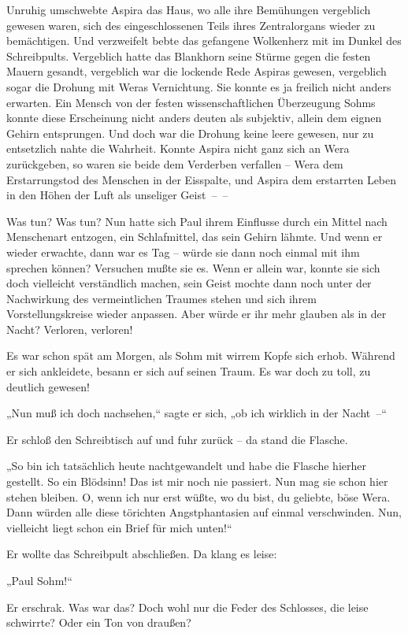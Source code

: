Unruhig umschwebte Aspira das Haus, wo alle ihre Bemühungen
vergeblich gewesen waren, sich des eingeschlossenen Teils ihres
Zentralorgans wieder zu bemächtigen. Und verzweifelt bebte das
gefangene Wolkenherz mit im Dunkel des Schreibpults. Vergeblich
hatte das Blankhorn seine Stürme gegen die festen Mauern gesandt,
vergeblich war die lockende Rede Aspiras gewesen, vergeblich sogar
die Drohung mit Weras Vernichtung. Sie konnte es ja freilich nicht
anders erwarten. Ein Mensch von der festen wissenschaftlichen
Überzeugung Sohms konnte diese Erscheinung nicht anders deuten als
subjektiv, allein dem eignen Gehirn entsprungen. Und doch war die
Drohung keine leere gewesen, nur zu entsetzlich nahte die Wahrheit.
Konnte Aspira nicht ganz sich an Wera zurückgeben, so waren sie
beide dem Verderben verfallen – Wera dem Erstarrungstod des
Menschen in der Eisspalte, und Aspira dem erstarrten Leben in den
Höhen der Luft als unseliger Geist~–~–

Was tun? Was tun? Nun hatte sich Paul ihrem Einflusse durch ein
Mittel nach Menschenart entzogen, ein Schlafmittel, das sein Gehirn
lähmte. Und wenn er wieder erwachte, dann war es Tag – würde sie
dann noch einmal mit ihm sprechen können? Versuchen mußte sie es.
Wenn er allein war, konnte sie sich doch vielleicht verständlich
machen, sein Geist mochte dann noch unter der Nachwirkung des
vermeintlichen Traumes stehen und sich ihrem Vorstellungskreise
wieder anpassen. Aber würde er ihr mehr glauben als in der Nacht?
Verloren, verloren!

Es war schon spät am Morgen, als Sohm mit wirrem Kopfe sich erhob.
Während er sich ankleidete, besann er sich auf seinen Traum. Es war
doch zu toll, zu deutlich gewesen!

„Nun muß ich doch nachsehen,“ sagte er sich, „ob ich wirklich in
der Nacht~–“

Er schloß den Schreibtisch auf und fuhr zurück – da stand die
Flasche.

„So bin ich tatsächlich heute nachtgewandelt und habe die Flasche
hierher gestellt. So ein Blödsinn! Das ist mir noch nie passiert.
Nun mag sie schon hier stehen bleiben. O, wenn ich nur erst wüßte,
wo du bist, du geliebte, böse Wera. Dann würden alle diese
törichten Angstphantasien auf einmal verschwinden. Nun, vielleicht
liegt schon ein Brief für mich unten!“

Er wollte das Schreibpult abschließen. Da klang es leise:

„Paul Sohm!“

Er erschrak. Was war das? Doch wohl nur die Feder des Schlosses,
die leise schwirrte? Oder ein Ton von draußen?

